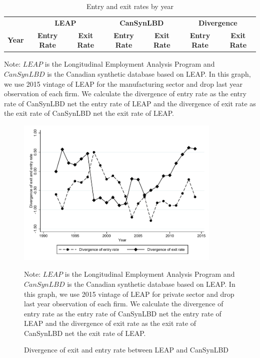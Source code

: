 \documentclass{article}
\begin{document}
\begin{table}[H]
  \centering
\begin{threeparttable}
 \caption{Entry and exit rates by year} \label{FirmDynamics} \medskip
\renewcommand{\arraystretch}{1}
\begin{tabular}{l|c c| c c| c c}
\toprule
&\multicolumn{2}{c|}{\textbf{LEAP}} &  \multicolumn{2}{c|}{\textbf{CanSynLBD}}&  \multicolumn{2}{c}{\textbf{Divergence}}\\
\textbf{Year}&\textbf{Entry Rate}&\textbf{Exit Rate}&\textbf{Entry Rate}&\textbf{Exit Rate} &\textbf{Entry Rate}&\textbf{Exit Rate}\\
\midrule

   \bottomrule
  \end{tabular} 
\begin{tablenotes}
\small
\item Note: $LEAP$ is the Longitudinal Employment Analysis Program and $CanSynLBD$ is the Canadian synthetic database based on LEAP. In this graph, we use 2015 vintage of LEAP for the manufacturing sector and drop last year observation of each firm. We calculate the divergence of entry rate as the entry rate of CanSynLBD net the entry rate of LEAP and the divergence of exit rate as the exit rate of CanSynLBD net the exit rate of LEAP.
 \end{tablenotes}
 \end{threeparttable}
\end{table}

\begin{figure} [H]
\centering
\caption{Divergence of exit and entry rate between LEAP and CanSynLBD} \label{Divergence}
\includegraphics[height=2.8in, width=.7\linewidth]{graphs/Divergence_of_exit_and_entry_rate_between_LEAP_and_CanSynLBD_bw.pdf} 
\begin{minipage}{0.85\textwidth}
{\footnotesize Note: $LEAP$ is the Longitudinal Employment Analysis Program and $CanSynLBD$ is the Canadian synthetic database based on LEAP. In this graph, we use 2015 vintage of LEAP for private sector and drop last year observation of each firm. We calculate the divergence of entry rate as the entry rate of CanSynLBD net the entry rate of LEAP and the divergence of exit rate as the exit rate of CanSynLBD net the exit rate of LEAP. \par}
\end{minipage}
\end{figure}
\end{document}
